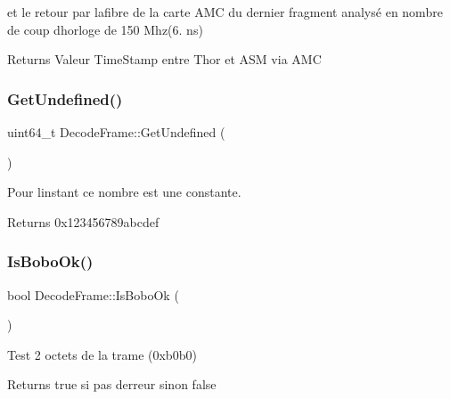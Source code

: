 et le retour par lafibre de la carte A\+MC du dernier fragment analysé en nombre de coup d\textquotesingle{}horloge de 150 Mhz(6. ns) \begin{DoxyReturn}{Returns}
Valeur Time\+Stamp entre Thor et A\+SM via A\+MC 
\end{DoxyReturn}
\mbox{\label{classDecodeFrame_a77f130ef36c084573decb71523cb74a1}} 
\subsubsection{\texorpdfstring{Get\+Undefined()}{GetUndefined()}}
{\footnotesize\ttfamily uint64\+\_\+t Decode\+Frame\+::\+Get\+Undefined (\begin{DoxyParamCaption}{ }\end{DoxyParamCaption})\hspace{0.3cm}{\ttfamily [inline]}}



Pour l\textquotesingle{}instant ce nombre est une constante. 

\begin{DoxyReturn}{Returns}
0x123456789abcdef 
\end{DoxyReturn}
\mbox{\label{classDecodeFrame_a0161fec474851adebcb4494c8773242e}} 
\subsubsection{\texorpdfstring{Is\+Bobo\+Ok()}{IsBoboOk()}}
{\footnotesize\ttfamily bool Decode\+Frame\+::\+Is\+Bobo\+Ok (\begin{DoxyParamCaption}{ }\end{DoxyParamCaption})\hspace{0.3cm}{\ttfamily [inline]}}



Test 2 octets de la trame (0xb0b0) 

\begin{DoxyReturn}{Returns}
true si pas d\textquotesingle{}erreur sinon false 
\end{DoxyReturn}
\mbox{\label{classDecodeFrame_a6dfe57ddaf11b02fd88c2edcc98091f3}} 
